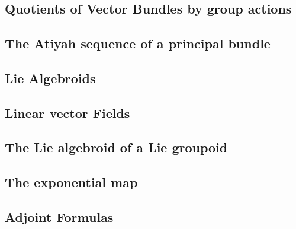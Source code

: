 \section{}

\subsection{Quotients of Vector Bundles by group actions}

\subsection{The Atiyah sequence of a principal bundle}

\subsection{Lie Algebroids}

\subsection{Linear vector Fields}

\subsection{The Lie algebroid of a Lie groupoid}

\subsection{The exponential map}

\subsection{Adjoint Formulas}